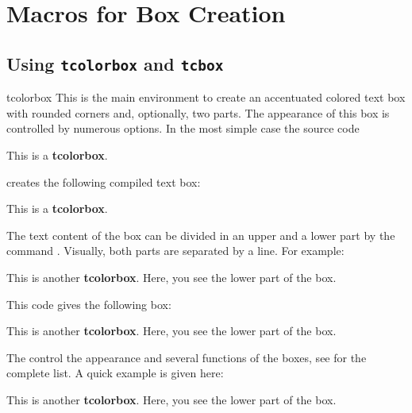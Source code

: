 \clearpage
\section{Macros for Box Creation}%
%
\subsection{Using \texttt{tcolorbox} and \texttt{tcbox}}\label{subsec:macros_using}
\begin{docEnvironment}{tcolorbox}{}
  This is the main environment to create an accentuated colored text box with
  rounded corners and, optionally, two parts. The appearance of this box
  is controlled by numerous options.
  In the most simple case the source code

\begin{dispListing}
\begin{tcolorbox}
This is a \textbf{tcolorbox}.
\end{tcolorbox}
\end{dispListing}

creates the following compiled text box:
\begin{tcolorbox}
This is a \textbf{tcolorbox}.
\end{tcolorbox}

The text content of the box can be divided
in an upper and a lower part
by the command . Visually, both parts are separated by a line.
For example:

\begin{dispListing}
\begin{tcolorbox}
This is another \textbf{tcolorbox}.
\tcblower
Here, you see the lower part of the box.
\end{tcolorbox}
\end{dispListing}

This code gives the following box:
\begin{tcolorbox}
This is another \textbf{tcolorbox}.
\tcblower
Here, you see the lower part of the box.
\end{tcolorbox}

The  control the appearance and several functions of the boxes,
see  for the complete list.
A quick example is given here:

\begin{dispExample}
\begin{tcolorbox}[colback=red!5!white,colframe=red!75!black,title=My nice heading]
This is another \textbf{tcolorbox}.
\tcblower
Here, you see the lower part of the box.
\end{tcolorbox}
\end{dispExample}
\end{docEnvironment}


